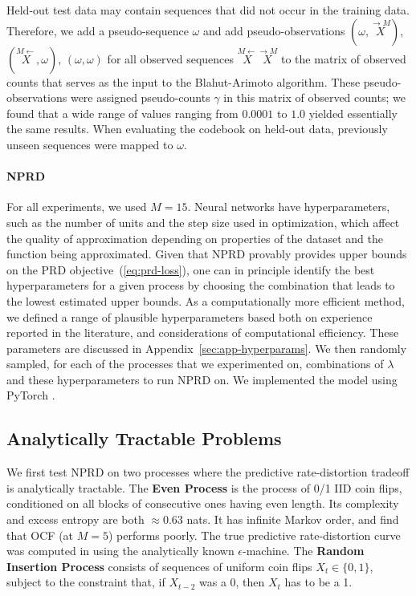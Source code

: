 \documentclass[entropy,article,submit,moreauthors,pdftex,10pt,a4paper]{Definitions/mdpi}
\newcommand{\key}{\textbf}
\newcommand{\finitefuture}{\stackrel{\rightarrow \scriptscriptstyle{M}}{X}}
\newcommand{\finitepast}{\stackrel{\scriptscriptstyle{M}\leftarrow}{X}}%
\begin{document}
Held-out test data may contain sequences that did not occur in the training data. Therefore, we add a pseudo-sequence $\omega$ and add pseudo-observations $(\omega, \finitefuture)$, $(\finitepast, \omega)$, $(\omega, \omega)$ for all observed sequences $\finitepast\finitefuture$ to the matrix of observed counts that serves as the input to the Blahut-Arimoto algorithm.
These pseudo-observations were assigned pseudo-counts $\gamma$ in this matrix of observed counts; we found that a wide range of values ranging from $0.0001$ to $1.0$ yielded essentially the same results.
When evaluating the codebook on held-out data, previously unseen sequences were mapped to $\omega$.


\paragraph{NPRD}
For all experiments, we used $M=15$.
Neural networks have hyperparameters, such as the number of units and the step size used in optimization, which affect the quality of approximation depending on properties of the dataset and the function being approximated.
Given that NPRD provably provides upper bounds on the PRD objective~(\ref{eq:prd-loss}), one can in principle identify the best hyperparameters for a given process by choosing the combination that leads to the lowest estimated upper bounds.
As a computationally more efficient method, we defined a range of plausible hyperparameters based both on experience reported in the literature, and considerations of computational efficiency.
These parameters are discussed in Appendix~\ref{sec:app-hyperparams}.
We then randomly sampled, for each of the processes that we experimented on, combinations of $\lambda$ and these hyperparameters to run NPRD on.
We implemented the model using PyTorch \citep{paszke2017automatic}.

\subsection{Analytically Tractable Problems}\label{sec:tractable}

We first test NPRD on two processes where the predictive rate-distortion tradeoff is analytically tractable. 
The \key{Even Process} \citep{marzen-predictive-2016} is the process of 0/1 IID coin flips, conditioned on all blocks of consecutive ones having even length.
Its complexity and excess entropy are both $\approx 0.63$ nats. %
It has infinite Markov order, and \citet{marzen-predictive-2016} find that OCF (at $M=5$) performs poorly. %
The true predictive rate-distortion curve was computed in \cite{marzen-predictive-2016} using the analytically known $\epsilon$-machine.
The \key{Random Insertion Process} \citep{marzen-predictive-2016} consists of sequences of uniform coin flips $X_t \in \{0,1\}$, subject to the constraint that, if $X_{t-2}$ was a 0, then $X_{t}$ has to be a 1.
\end{document}
